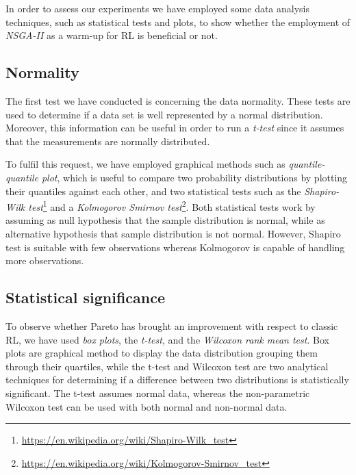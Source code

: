 In order to assess our experiments we have employed some data analysis techniques, such as statistical tests and plots, to show whether the employment of \emph{NSGA-II} as a warm-up for RL is beneficial or not.

\subsection{Normality} 
The first test we have conducted is concerning the data normality. These tests are used to determine if a data set is well represented by a normal distribution. Moreover, this information can be useful in order to run a \emph{t-test} since it assumes that the measurements are normally distributed.

To fulfil this request, we have employed graphical methods such as \emph{quantile-quantile plot}, which is useful to compare two probability distributions by plotting their quantiles against each other, and two statistical tests such as the \emph{Shapiro-Wilk test}\footnote{\href{https://en.wikipedia.org/wiki/Shapiro\%E2\%80\%93Wilk_test}{https://en.wikipedia.org/wiki/Shapiro-Wilk\_test}} and a \emph{Kolmogorov Smirnov test}\footnote{\href{https://en.wikipedia.org/wiki/Kolmogorov\%E2\%80\%93Smirnov_test}{https://en.wikipedia.org/wiki/Kolmogorov-Smirnov\_test}}. Both statistical tests work by assuming as null hypothesis that the sample distribution is normal, while as alternative hypothesis that sample distribution is not normal. However, Shapiro test is suitable with few observations whereas Kolmogorov is capable of handling more observations.

\subsection{Statistical significance} 
To observe whether Pareto has brought an improvement with respect to classic RL, we have used \emph{box plots}, the \emph{t-test}, and the \emph{Wilcoxon rank mean test}.
Box plots are graphical method to display the data distribution grouping them through their quartiles, while the t-test and Wilcoxon test are two analytical techniques for determining if a difference between two distributions is statistically significant. The t-test assumes normal data, whereas the non-parametric Wilcoxon test can be used with both normal and non-normal data.

